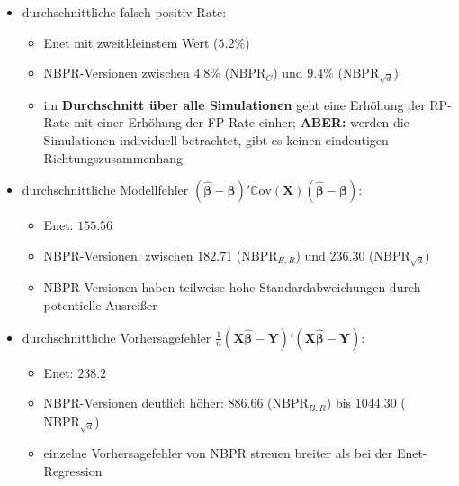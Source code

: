 \documentclass{beamer}
\begin{document}
\begin{frame}
	\begin{itemize}
	\item durchschnittliche falsch-positiv-Rate:
	\begin{itemize}
	\item Enet mit zweitkleinstem Wert ($5.2\%$)
	\item NBPR-Versionen zwischen $4.8\%$ ($\text{NBPR}_{C}$) und $9.4\%$ ($\text{NBPR}_{\sqrt{d}}$)
	\item im \textbf{Durchschnitt über alle Simulationen} geht eine Erhöhung der RP-Rate mit einer Erhöhung der FP-Rate einher; \textbf{ABER:} werden die Simulationen individuell betrachtet, gibt es keinen eindeutigen Richtungszusammenhang  
	\end{itemize}
	\end{itemize}
\end{frame}


\begin{frame}
	\begin{itemize}
	\item durchschnittliche Modellfehler $(\boldsymbol{\hat{\beta}}- \boldsymbol{\beta})'\mathbb{C}\text{ov}(\mathbf{X})(\boldsymbol{\hat{\beta}}- \boldsymbol{\beta})$:
	\begin{itemize}
	\item Enet: $155.56$
	\item NBPR-Versionen: zwischen $182.71$ ($\text{NBPR}_{E,R}$) und $236.30$ ($\text{NBPR}_{\sqrt{d}}$)
	\item NBPR-Versionen haben teilweise hohe Standardabweichungen durch potentielle Ausreißer
	\end{itemize}
	\item durchschnittliche Vorhersagefehler $\frac{1}{n}(\mathbf{X}\boldsymbol{\hat{\beta}}- \mathbf{Y})'(\mathbf{X}\boldsymbol{\hat{\beta}}- \mathbf{Y})$:
	\begin{itemize}
	\item Enet: $238.2$
	\item NBPR-Versionen deutlich höher: $886.66$ ($\text{NBPR}_{B,R}$) bis $1044.30$ ($\text{NBPR}_{\sqrt{d}}$)
	\item einzelne Vorhersagefehler von NBPR streuen breiter als bei der Enet-Regression 
	\end{itemize}
	\end{itemize}
\end{frame}
\end{document}

